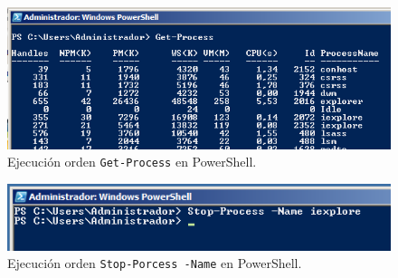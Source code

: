 \begin{figure}[H]
    \begin{center}
    \advance\leftskip-1cm
        \includegraphics[scale=0.7]{imagenes/img42}
        \caption{Ejecución orden \texttt{Get-Process} en PowerShell.}
        \label{fig39}
    \end{center}
\end{figure}

\begin{figure}[H]
    \begin{center}
    \advance\leftskip-1cm
        \includegraphics[scale=0.7]{imagenes/img43}
        \caption{Ejecución orden \texttt{Stop-Porcess -Name} en PowerShell.}
        \label{fig40}
    \end{center}
\end{figure}

\newpage




